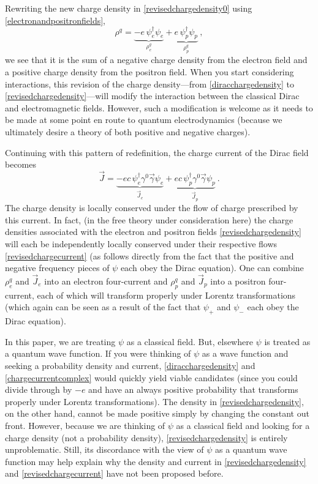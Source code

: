\documentclass[onecolumn,secnumarabic,amsmath,amssymb,balancelastpage,nofootinbib]{article}
\begin{document}
Rewriting the new charge density in \eqref{revisedchargedensity0} using \eqref{electronandpositronfields},
\begin{equation}
\rho^q=\underbrace{-e\, \psi_e^{\dagger} \psi_e}_{\mbox{$\rho^q_e$}} +\underbrace{e\, \psi_p^{\dagger} \psi_p}_{\mbox{$\rho^q_p$}}
\ ,
\label{revisedchargedensity}
\end{equation}
we see that it is the sum of a negative charge density from the electron field and a positive charge density from the positron field.  When you start considering interactions, this revision of the charge density---from \eqref{diracchargedensity} to \eqref{revisedchargedensity}---will modify the interaction between the classical Dirac and electromagnetic fields.  However, such a modification is welcome as it needs to be made at some point en route to quantum electrodynamics (because we ultimately desire a theory of both positive and negative charges).


Continuing with this pattern of redefinition, the charge current of the Dirac field becomes
\begin{equation}
\vec{J}=\underbrace{-e c\, \psi_e^{\dagger} \gamma^0 \vec{\gamma} \psi_e}_{\mbox{$\vec{J}_e$}} + \underbrace{e c\, \psi_p^{\dagger} \gamma^0 \vec{\gamma} \psi_p}_{\mbox{$\vec{J}_p$}}
\ .
\label{revisedchargecurrent}
\end{equation}
The charge density is locally conserved under the flow of charge prescribed by this current.  In fact, (in the free theory under consideration here) the charge densities associated with the electron and positron fields \eqref{revisedchargedensity} will each be independently locally conserved under their respective flows \eqref{revisedchargecurrent} (as follows directly from the fact that the positive and negative frequency pieces of $\psi$ each obey the Dirac equation).  One can combine $\rho^q_e$ and $\vec{J}_e$ into an electron four-current and $\rho^q_p$ and $\vec{J}_p$ into a positron four-current, each of which will transform properly under Lorentz transformations (which again can be seen as a result of the fact that $\psi_+$ and $\psi_-$ each obey the Dirac equation).


In this paper, we are treating $\psi$ as a classical field.  But, elsewhere $\psi$ is treated as a quantum wave function.  If you were thinking of $\psi$ as a wave function and seeking a probability density and current, \eqref{diracchargedensity} and \eqref{chargecurrentcomplex} would quickly yield viable candidates (since you could divide through by $-e$ and have an always positive probability that transforms properly under Lorentz transformations).  The density in \eqref{revisedchargedensity}, on the other hand, cannot be made positive simply by changing the constant out front.  However, because we are thinking of $\psi$ as a classical field and looking for a charge density (not a probability density), \eqref{revisedchargedensity} is entirely unproblematic.  Still, its discordance with the view of $\psi$ as a quantum wave function may help explain why the density and current in \eqref{revisedchargedensity} and \eqref{revisedchargecurrent} have not been proposed before.
\end{document}
